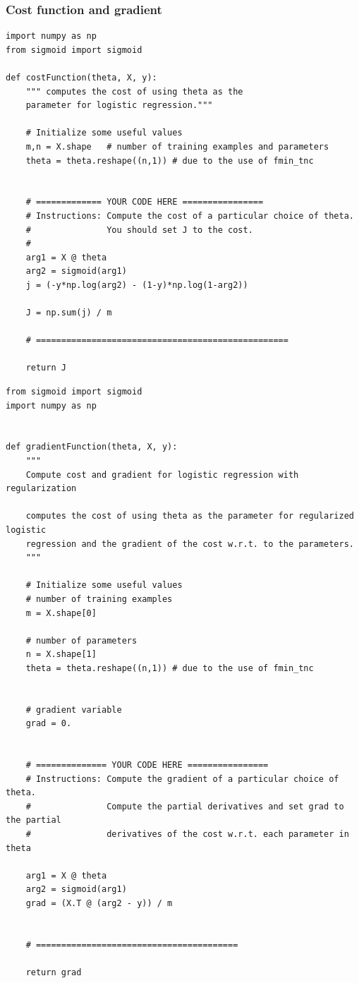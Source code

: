 \subsubsection{Cost function and gradient}

\begin{lstlisting}
import numpy as np
from sigmoid import sigmoid

def costFunction(theta, X, y):
    """ computes the cost of using theta as the
    parameter for logistic regression."""

	# Initialize some useful values
    m,n = X.shape   # number of training examples and parameters
    theta = theta.reshape((n,1)) # due to the use of fmin_tnc

    
    # ============= YOUR CODE HERE ================
    # Instructions: Compute the cost of a particular choice of theta.
    #               You should set J to the cost.
    #
    arg1 = X @ theta
    arg2 = sigmoid(arg1)
    j = (-y*np.log(arg2) - (1-y)*np.log(1-arg2))   

    J = np.sum(j) / m

    # ==================================================
    
    return J

\end{lstlisting}



\begin{lstlisting}
from sigmoid import sigmoid
import numpy as np


def gradientFunction(theta, X, y):
    """
    Compute cost and gradient for logistic regression with regularization

    computes the cost of using theta as the parameter for regularized logistic 
    regression and the gradient of the cost w.r.t. to the parameters.
    """

    # Initialize some useful values
    # number of training examples 
    m = X.shape[0]   

    # number of parameters
    n = X.shape[1]   
    theta = theta.reshape((n,1)) # due to the use of fmin_tnc


    # gradient variable
    grad = 0.


    # ============== YOUR CODE HERE ================
    # Instructions: Compute the gradient of a particular choice of theta.
    #               Compute the partial derivatives and set grad to the partial
    #               derivatives of the cost w.r.t. each parameter in theta

    arg1 = X @ theta
    arg2 = sigmoid(arg1)
    grad = (X.T @ (arg2 - y)) / m


    # ========================================

    return grad

\end{lstlisting}

